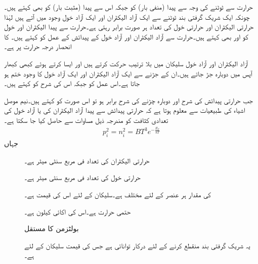 حرارت سے  ٹوٹنے کی وجہ سے پیدا  (منفی بار) کو
   جبکہ اس سے پیدا  (مثبت بار) کو 
  بھی کہتے ہیں۔چونکہ ایک شریک گرفتی بند ٹوٹنے سے ایک آزاد الیکٹران اور ایک آزاد خول وجود میں آتے ہیں لہٰذا حرارتی الیکٹران اور حرارتی خول کی تعداد ہر صورت برابر رہتی ہے۔حرارت سے پیدا الیکٹران اور خول کو   اور   بھی کہتے ہیں۔حرارت سے آزاد الیکٹران اور آزاد خول کے پیدائش کے عمل کو   کہتے ہیں۔  کا انحصار درجہ حرارت پر ہے۔

آزاد الیکٹران اور آزاد خول سلیکان میں بلا ترتیب حرکت کرتے ہیں اور ایسا کرتے ہوئے کبھی کبھار آپس میں دوبارہ جڑ جاتے ہیں۔ان کے جڑنے سے ایک آزاد الیکٹران اور ایک آزاد خول کا وجود ختم ہو جاتا ہے۔اس عمل کو   جبکہ اس کی شرح کو  کہتے ہیں۔

جب حرارتی پیدائش کی شرح اور دوبارہ چڑنے کی شرح برابر ہو تو اس صورت کو  کہتے ہیں۔نیم موصل اشیاء کی طبیعیات سے معلوم ہوتا ہے کہ حرارتی پیدائش سے پیدا آزاد الیکٹران کی    یا آزاد خول کی تعدادی کثافت   کو مندرجہ ذیل مساوات سے حاصل کیا جا سکتا ہے۔
\begin{align} \label{مساوات_ڈایوڈ_حرارتی_توازن_میں_تعدادی_کثافت}
p_i^{2}=n_i^{2}=B T^{3} e^{-\frac{E_{\sigma}}{k T}}
\end{align}
جہاں
\begin{description}
\item
[ ] حرارتی الیکٹران کی تعداد فی مربع سنٹی میٹر ہے۔
\item
[  ] حرارتی خول کی تعداد فی مربع سنٹی میٹر ہے۔
\item
[ ] کی مقدار ہر عنصر کے لئے مختلف ہے۔سلیکان کے لئے اس کی قیمت  ہے۔
\item
[] حتمی حرارت ہے۔اس کی اکائی کیلون  ہے۔
\item
[ ]  بولٹزمن کا مستقل 
\item
[]  یہ شریک گرفتی بند منقطع کرنے کے لئے درکار توانائی ہے جس کی قیمت سلیکان کے لئے  ہے۔
\end{description}



